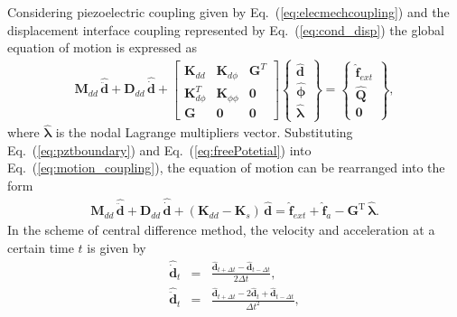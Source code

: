 \documentclass[11pt,a4paper,final]{report}
\theoremstyle{plain}
\begin{document}
Considering piezoelectric coupling given by Eq.~(\ref{eq:elecmechcoupling}) and the displacement interface coupling represented by Eq.~(\ref{eq:cond_disp}) the global equation of motion is expressed as
\begin{eqnarray}
	\label{eq:motion_coupling}
	\textbf{M}_{dd}\,\widehat{\ddot{\textbf{d}}} +
	\textbf{D}_{dd}\,\widehat{\dot{\textbf{d}}} +
	\left [\begin{array}{ccc}
		\textbf{K}_{dd}&\textbf{K}_{d\phi}&\textbf{G}^T\\
		\textbf{K}_{d\phi}^T&\textbf{K}_{\phi \phi}&\textbf{0}\\
		\textbf{G}&\textbf{0}&\textbf{0}
	\end{array}\right]
	\left \{\begin{array}{c}
		\widehat{\textbf{d}}\\
		\widehat{\boldsymbol{\phi}}\\
		\widehat{\boldsymbol{\lambda}}
	\end{array}\right\} =
	\left \{\begin{array}{c}
		\widehat{\textbf{f}}_{ext} \\
		\widehat{\textbf{Q}}\\
		\textbf{0}
	\end{array}\right \},
\end{eqnarray}
where \(\widehat{\boldsymbol{\lambda}}\) is the nodal Lagrange multipliers vector.
Substituting Eq.~(\ref{eq:pztboundary}) and Eq.~(\ref{eq:freePotetial}) into Eq.~(\ref{eq:motion_coupling}), the equation of motion can be rearranged into the form
\begin{eqnarray}
	\textbf{M}_{dd}\,\widehat{\ddot{\textbf{d}}} + \textbf{D}_{dd} \,\widehat{\dot{\textbf{d}}} + (\textbf{K}_{dd}-\textbf{K}_{s}) \,\widehat{\textbf{d}}  = \widehat{\textbf{f}}_{ext} + \widehat{\textbf{f}}_{a} - \textbf{G}^{\mathrm{T}}\,\widehat{\boldsymbol{\lambda}}.
	\label{eq:motionD}
\end{eqnarray}
In the scheme of central difference method, the velocity and acceleration at a certain time \(t\) is given by
\begin{eqnarray}
	\label{eq:v}
	\widehat{\dot{\textbf{d}}}_{t} & = & \frac{\widehat{\textbf{d}}_{t+\Delta t} - \widehat{\textbf{d}}_{t-\Delta t}}{2\Delta t},\\
	\label{eq:a}
	\widehat{\ddot{\textbf{d}}}_{t} & = & \frac{\widehat{\textbf{d}}_{t+\Delta t} - 2\widehat{\textbf{d}}_{t} + \widehat{\textbf{d}}_{t-\Delta t}}{\Delta t^2},
\end{eqnarray}
\end{document}
